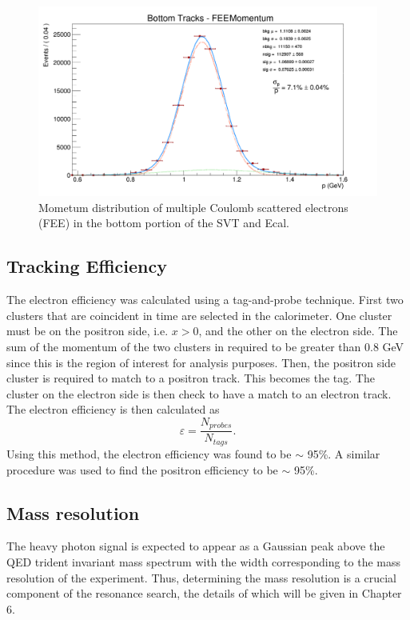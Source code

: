 \begin{figure}[h!b]
    \centering
    \includegraphics[width=.95\textwidth]{images/20160424_fee_bottom_tracks_p.png}
    \caption{Mometum distribution of multiple Coulomb scattered electrons (FEE) in
             the bottom portion of the SVT and Ecal.}
    \label{fig:bot_p}
\end{figure}

\subsection{Tracking Efficiency}

The electron efficiency was calculated using a tag-and-probe technique.  First
two clusters that are coincident in time are selected in the calorimeter. One
cluster must be on the positron side, i.e. $x > 0$, and the other on the electron
side.  The sum of the momentum of the two clusters in required to be greater 
than 0.8 GeV since this is the region of interest for analysis purposes. Then, 
the positron side cluster is required to match to a positron track.  This 
becomes the tag.  The cluster on the electron side is then check to have a 
match to an electron track.  The electron efficiency is then calculated as 
\begin{equation}
    \varepsilon = \frac{N_{probes}}{N_{tags}}.
\end{equation}
Using this method, the electron efficiency was found to be $\sim$ 95\%. A similar
procedure was used to find the positron efficiency to be $\sim$ 95\%.

\subsection{Mass resolution} \label{sec:mass_res}

The heavy photon signal is expected to appear as a Gaussian peak above the QED 
trident invariant mass spectrum with the width corresponding to the mass 
resolution of the experiment.  Thus, determining the mass resolution is a crucial
component of the resonance search, the details of which will be given in Chapter 6.

